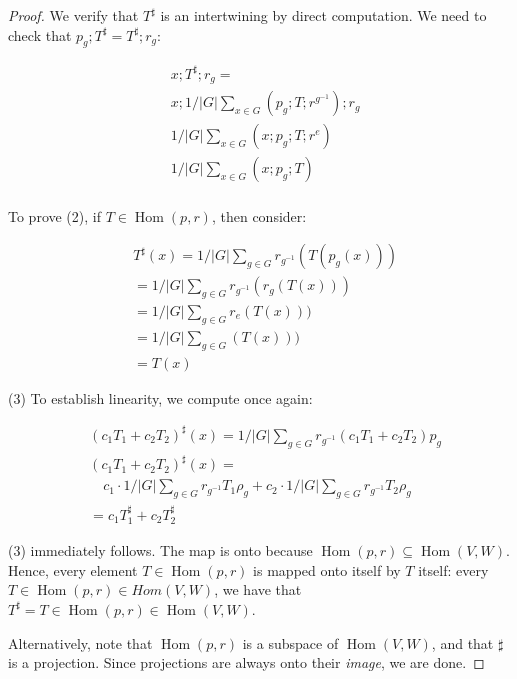 \documentclass{book}
\newcommand{\Hom}{\operatorname{Hom}}
\theoremstyle{definition}
\begin{document}
\begin{proof}
We verify that $T^\sharp$ is an intertwining by direct computation. We need
to check that $p_g; T^\sharp = T^\sharp; r_g$:

\begin{align*}
&x; T^\sharp; r_g =  \\
&x; 1/|G| \sum_{x \in G} (p_g; T; r^{g^{-1}}); r_g \\
&1/|G| \sum_{x \in G} (x; p_g; T; r^{e}) \\
&1/|G| \sum_{x \in G} (x; p_g; T) \\
\end{align*}

To prove (2), if $T \in \Hom(p, r)$, then consider:

\begin{align*}
&T^\sharp(x) = 1/|G|\sum_{g \in G} r_{g^{-1}} (T(p_g (x))) \\
& = 1/|G|\sum_{g \in G} r_{g^{-1}} (r_g(T (x))) \\
& = 1/|G|\sum_{g \in G} r_{e}(T (x))) \\
& = 1/|G|\sum_{g \in G} (T (x))) \\
& = T(x)
\end{align*}

(3) To establish linearity, we compute once again:


\begin{align*}
&(c_1T_1 + c_2 T_2)^\sharp(x) = 1/|G|\sum_{g \in G} r_{g^{-1}} (c_1 T_1 + c_2 T_2) p_g \\
&(c_1T_1 + c_2 T_2)^\sharp(x) = \\
& \quad c_1 \cdot 1/|G|\sum_{g \in G} r_{g^{-1}}  T_1 \rho_g + 
 c_2 \cdot 1/|G|\sum_{g \in G} r_{g^{-1}} T_2 \rho_g \\
&= c_1 T_1^\sharp + c_2 T_2^\sharp
\end{align*}


(3) immediately follows. The map is onto because $\Hom(p, r) \subseteq \Hom(V, W)$.
Hence, every element $T \in \Hom(p, r)$ is mapped onto itself by $T$ itself:
every $T \in \Hom(p, r) \in Hom(V, W)$, we have that $T^\sharp = T \in \Hom(p, r) \in \Hom(V, W)$.


Alternatively, note that $\Hom(p, r)$ is a subspace of $\Hom(V, W)$, and that 
$\sharp$ is a projection. Since projections are always onto their \emph{image}, we are done.
\end{proof}
\end{document}
